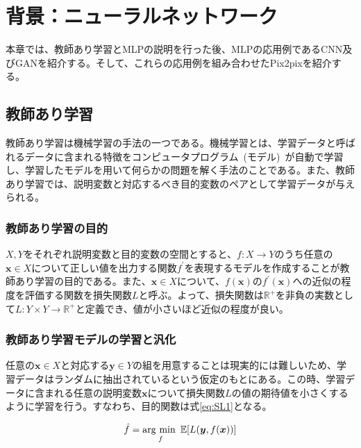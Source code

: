 \chapter{背景：ニューラルネットワーク}

本章では、教師あり学習とMLPの説明を行った後、MLPの応用例であるCNN及びGANを紹介する。そして、これらの応用例を組み合わせたPix2pixを紹介する。

\section{教師あり学習}

教師あり学習は機械学習の手法の一つである。機械学習とは、学習データと呼ばれるデータに含まれる特徴をコンピュータプログラム~(モデル)~が自動で学習し、学習したモデルを用いて何らかの問題を解く手法のことである。また、教師あり学習では、説明変数と対応するべき目的変数のペアとして学習データが与えられる。

\subsection{教師あり学習の目的}

$X,Y$をそれぞれ説明変数と目的変数の空間とすると、$f:X\rightarrow Y$のうち任意の$\boldsymbol{x} \in X$について正しい値を出力する関数$f^{'}$を表現するモデルを作成することが教師あり学習の目的である。また、$\boldsymbol{x} \in X$について、$f(\boldsymbol{x})$の$f^{'}(\boldsymbol{x})$への近似の程度を評価する関数を損失関数$L$と呼ぶ。よって、損失関数は$\mathbb{R}^+$を非負の実数として$L:Y \times Y \rightarrow \mathbb{R}^+$と定義でき、値が小さいほど近似の程度が良い。

\subsection{教師あり学習モデルの学習と汎化}

任意の$\boldsymbol{x} \in X$と対応する$\boldsymbol{y} \in Y$の組を用意することは現実的には難しいため、学習データはランダムに抽出されているという仮定のもとにある。この時、学習データに含まれる任意の説明変数$\boldsymbol{x}$について損失関数$L$の値の期待値を小さくするように学習を行う。すなわち、目的関数は式\ref{eq:SL1}となる。

\begin{align}
    \label{eq:SL1}
    \hat{f}=\mathop{\rm arg~min~}\limits _{f} \mathbb{E}[L(\boldsymbol{y},f(\boldsymbol{x}))]
\end{align}

